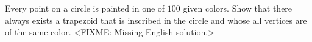 \problem
Every point on a circle is painted in one of $100$ given colors.
Show that there always exists a trapezoid that is inscribed in the circle and
whose all vertices are of the same color.
\solution
<FIXME: Missing English solution.>
\endproblem

